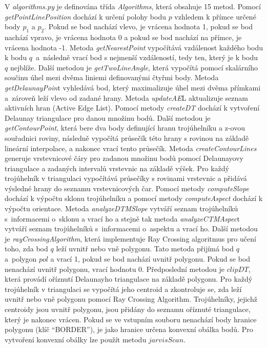\documentclass{article}
\begin{document}
\begin{spacing}{1.5}
V \textit{algorithms.py} je definována třída \textit{Algorithms}, která obsahuje 15 metod. Pomocí \textit{getPointLinePosition} dochází k určení polohy bodu $p$ vzhledem k přímce určené body $p_1$ a $p_2$. Pokud se bod nachází vlevo, je vrácena hodnota 1, pokud se bod nachází vpravo, je vrácena hodnota 0 a pokud se bod nachází na přímce, je vrácena hodnota -1. Metoda \textit{getNearestPoint} vypočítává vzdálenost každého bodu k bodu $q$~a~následně vrací bod s nejmenší vzdáleností, tedy ten, který je k bodu $q$ nejblíže. Další metodou je \textit{getTwoLineAngle}, která vypočítá pomocí skalárního součinu úhel mezi dvěma liniemi definovanými čtyřmi body. Metoda \textit{getDelaunayPoin}t vyhledává bod, který maximalizuje úhel mezi dvěma přímkami a~zároveň leží vlevo od zadané hrany. Metoda \textit{updateAE}L aktualizuje seznam aktivních hran (Active Edge List). Pomocí metody \textit{createDT} dochází k vytvoření Delaunay triangulace pro danou množinu bodů. Další metodou je \textit{getContourPoint}, která bere dva body definující hranu trojúhelníku a z-ovou souřadnici roviny, následně vypočítá průsečík této hrany s rovinou na základě lineární interpolace, a nakonec vrací tento průsečík. Metoda \textit{createContourLines} generuje vrstevnicové čáry pro zadanou množinu bodů pomocí Delaunayovy triangulace a zadaných intervalů vrstevnic na základě výšek. Pro každý trojúhelník v triangulaci vypočítává průsečíky s rovinami vrstevnic a přidává výsledné hrany do seznamu vrstevnicových čar. Pomocí metody \textit{computeSlope} dochází k výpočtu sklonu trojúhelníku a pomocí metody \textit{computeAspect} dochází k výpočtu orientace. Metoda \textit{analyzeDTMSlope} vytváří seznam trojúhelníků s~informacemi o~sklonu a vrací ho a stejně tak metoda \textit{analyzeCTMAspec}t vytváří seznam trojúhelníků s~informacemi o~aspektu a vrací ho. Další metodou je \textit{rayCrossingAlgorithm}, která implementuje Ray Crossing algoritmus pro učení toho, zda bod $q$ leží uvnitř nebo vně polygonu. Tato metoda přijímá bod $q$ a~polygon $pol$ a vrací 1, pokud se bod nachází uvnitř polygonu. Pokud se bod nenachází uvnitř polygonu, vrací hodnotu 0. Předposlední metodou je $clipDT$, která provádí oříznutí Delaunayho triangulace na základě polygonu. Pro každý trojúhelník v triangulaci se vypočítá jeho centroid a zkontroluje se, zda leží uvnitř nebo vně polygonu pomocí Ray Crossing Algorithm. Trojúhelníky, jejichž centroidy jsou uvnitř polygonu, jsou přidány do seznamu oříznuté triangulace, který je nakonec vrácen. Pokud se ve vstupním souboru nenachází body hranice polygonu (klíč “BORDER”), je jako hranice určena konvexní obálka bodů. Pro vytvoření konvexní obálky lze použít metodu $jarvisScan$.


\end{spacing}
\end{document}
